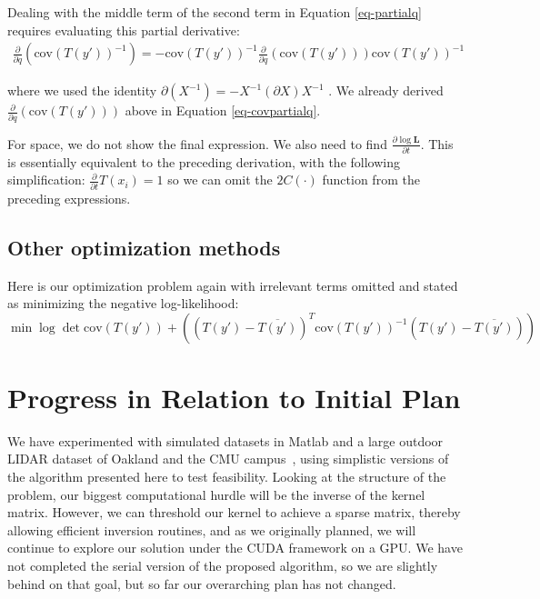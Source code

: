 \documentclass{article} %
\begin{document}
Dealing with the middle term of the second term in Equation \ref{eq-partialq} requires evaluating this partial derivative:
\begin{eqnarray*}
\frac{\partial}{\partial q} \left(\mbox{cov}(T(y'))^{-1}\right) = -\mbox{cov}(T(y'))^{-1} \frac{\partial}{\partial q}\left(\mbox{cov}(T(y'))\right) \mbox{cov}(T(y'))^{-1}
\end{eqnarray*}

where we used the identity $\partial(X^{-1}) = - X^{-1} (\partial X) X^{-1}$ \cite{petersen2008matrix}. We already derived $\frac{\partial}{\partial q} (\mbox{cov}(T(y')))$ above in Equation \ref{eq-covpartialq}.

For space, we do not show the final expression. We also need to find $\frac{\partial \log \mathbf{L}}{\partial t}$. This is essentially
equivalent to the preceding derivation, with the following simplification: $\frac{\partial }{\partial t} T(x_i) = 1$ so we can omit the $2C(\cdot)$ function from the preceding expressions.

\subsection{Other optimization methods}
Here is our optimization problem again with irrelevant terms omitted and stated as minimizing the negative log-likelihood:
$$\min \log \det \mbox{cov}(T(y')) + \left((T(y') - \overline{T(y')})^T \mbox{cov}(T(y'))^{-1} (T(y') - \overline{T(y')})\right)$$




\section{Progress in Relation to Initial Plan}

We have experimented with simulated datasets in Matlab and a large outdoor LIDAR dataset of Oakland and the CMU campus~\cite{munoz2009contextual}, using simplistic versions of the algorithm presented here to test feasibility. Looking at the structure of the problem, our biggest computational hurdle will be the inverse of the kernel matrix. However, we can threshold our kernel to achieve a sparse matrix, thereby allowing efficient inversion routines, and as we originally planned, we will continue to explore our solution under the CUDA framework on a GPU. We have not completed the serial version of the proposed algorithm, so we are slightly behind on that goal, but so far our overarching plan has not changed. 





\end{document}

